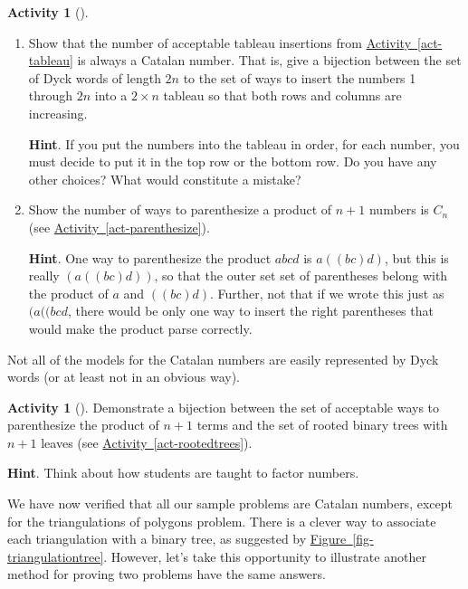 \documentclass[10pt,]{book}
\theoremstyle{plain}
\theoremstyle{definition}
\theoremstyle{definition}
\theoremstyle{definition}
\newtheorem{activity}[project]{Activity}
\numberwithin{equation}{chapter}
\begin{document}
\begin{activity}[]\label{activity-172}
\leavevmode%
\begin{enumerate}[font=\bfseries,label=(\alph*),ref=\alph*]
\item\label{task-187} \hypertarget{p-1014}{}%
Show that the number of acceptable tableau insertions from \hyperref[act-tableau]{Activity~\ref{act-tableau}} is always a Catalan number.  That is, give a bijection between the set of Dyck words of length \(2n\) to the set of ways to insert the numbers 1 through \(2n\) into a \(2\times n\) tableau so that both rows and columns are increasing.%
\par\smallskip%
\noindent\textbf{Hint}.\hypertarget{hint-118}{}\quad%
\hypertarget{p-1015}{}%
If you put the numbers into the tableau in order, for each number, you must decide to put it in the top row or the bottom row.  Do you have any other choices?  What would constitute a mistake?%
\item\label{task-188} \hypertarget{p-1016}{}%
Show the number of ways to parenthesize a product of \(n+1\) numbers is \(C_n\) (see \hyperref[act-parenthesize]{Activity~\ref{act-parenthesize}}).%
\par\smallskip%
\noindent\textbf{Hint}.\hypertarget{hint-119}{}\quad%
\hypertarget{p-1017}{}%
One way to parenthesize the product \(abcd\) is \(a((bc)d)\), but this is really \((a((bc)d))\), so that the outer set set of parentheses belong with the product of \(a\) and \(((bc)d)\).  Further, not that if we wrote this just as \((a((bcd\), there would be only one way to insert the right parentheses that would make the product parse correctly.%
\end{enumerate}
\end{activity}
\hypertarget{p-1018}{}%
Not all of the models for the Catalan numbers are easily represented by Dyck words (or at least not in an obvious way).%
\begin{activity}[]\label{activity-173}
\hypertarget{p-1019}{}%
Demonstrate a bijection between the set of acceptable ways to parenthesize the product of \(n+1\) terms and the set of rooted binary trees with \(n+1\) leaves (see \hyperref[act-rootedtrees]{Activity~\ref{act-rootedtrees}}).%
\par\smallskip%
\noindent\textbf{Hint}.\hypertarget{hint-120}{}\quad%
\hypertarget{p-1020}{}%
Think about how students are taught to factor numbers.%
\end{activity}
\hypertarget{p-1021}{}%
We have now verified that all our sample problems are Catalan numbers, except for the triangulations of polygons problem.  There is a clever way to associate each triangulation with a binary tree, as suggested by \hyperref[fig-triangulationtree]{Figure~\ref{fig-triangulationtree}}.  However, let's take this opportunity to illustrate another method for proving two problems have the same answers.%
\end{document}

